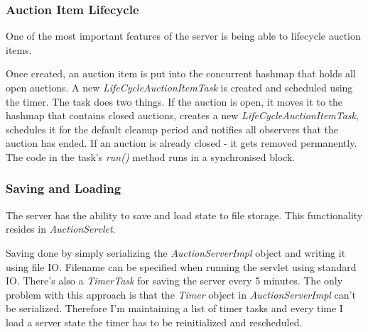 \documentclass[10pt]{article}
\begin{document}
\subsubsection{Auction Item Lifecycle}
One of the most important features of the server is being able to lifecycle auction items.\par
Once created, an auction item is put into the concurrent hashmap that holds all open auctions. A new \textit{LifeCycleAuctionItemTask} is created and scheduled using the timer. The task does two things. If the auction is open, it moves it to the hashmap that contains closed auctions, creates a new \textit{LifeCycleAuctionItemTask}, schedules it for the default cleanup period and notifies all observers that the auction has ended. If an auction is already closed - it gets removed permanently. The code in the task's \textit{run()} method runs in a synchronised block.\pagebreak
\subsubsection{Saving and Loading}
The server has the ability to save and load state to file storage. This functionality resides in \textit{AuctionServlet}.\\ \par
Saving  done by simply serializing the \textit{AuctionServerImpl} object and writing it using file IO. Filename can be specified when running the servlet using standard IO. There's also a \textit{TimerTask} for saving the server every 5 minutes. The only problem with this approach is that the \textit{Timer} object in \textit{AuctionServerImpl} can't be serialized. Therefore I'm maintaining a list of timer tasks and every time I load a server state the timer has to be reinitialized and rescheduled.
\end{document}
